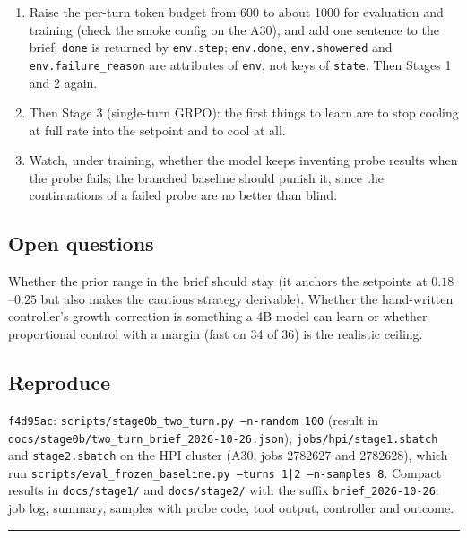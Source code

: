\documentclass[11pt,a4paper]{article}
\newcommand{\commit}[1]{\texttt{\textcolor{commitgray}{#1}}}
\begin{document}
\begin{enumerate}[nosep]
\item Raise the per-turn token budget from 600 to about 1000 for evaluation
  and training (check the smoke config on the A30), and add one sentence to
  the brief: \texttt{done} is returned by \texttt{env.step}; \texttt{env.done},
  \texttt{env.showered} and \texttt{env.failure\_reason} are attributes of
  \texttt{env}, not keys of \texttt{state}. Then Stages 1 and 2 again.
\item Then Stage 3 (single-turn GRPO): the first things to learn are to
  stop cooling at full rate into the setpoint and to cool at all.
\item Watch, under training, whether the model keeps inventing probe results
  when the probe fails; the branched baseline should punish it, since the
  continuations of a failed probe are no better than blind.
\end{enumerate}

\subsection*{Open questions}

Whether the prior range in the brief should stay (it anchors the setpoints
at $0.18$--$0.25$ but also makes the cautious strategy derivable). Whether the
hand-written controller's growth correction is something a 4B model can
learn or whether proportional control with a margin (fast on 34 of 36) is
the realistic ceiling.

\subsection*{Reproduce}

\begin{sloppypar}
\commit{f4d95ac}: \texttt{scripts/stage0b\_two\_turn.py --n-random 100}
(result in \texttt{docs/stage0b/two\_turn\_brief\_2026-10-26.json});
\texttt{jobs/hpi/stage1.sbatch} and \texttt{stage2.sbatch} on the HPI
cluster (A30, jobs 2782627 and 2782628), which run
\texttt{scripts/eval\_frozen\_baseline.py --turns 1|2 --n-samples 8}. Compact
results in \texttt{docs/stage1/} and \texttt{docs/stage2/} with the suffix
\texttt{brief\_2026-10-26}: job log, summary, samples with probe code, tool
output, controller and outcome.
\end{sloppypar}

\bigskip
\hrule
\bigskip

\end{document}
